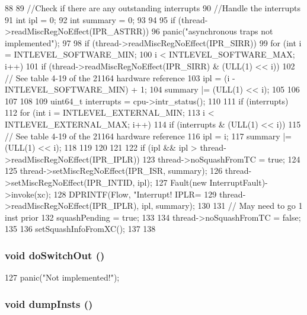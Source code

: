 \begin{DoxyCode}
88 {
89     //Check if there are any outstanding interrupts
90     //Handle the interrupts
91     int ipl = 0;
92     int summary = 0;
93 
94 
95     if (thread->readMiscRegNoEffect(IPR_ASTRR))
96         panic("asynchronous traps not implemented\n");
97 
98     if (thread->readMiscRegNoEffect(IPR_SIRR)) {
99         for (int i = INTLEVEL_SOFTWARE_MIN;
100              i < INTLEVEL_SOFTWARE_MAX; i++) {
101             if (thread->readMiscRegNoEffect(IPR_SIRR) & (ULL(1) << i)) {
102                 // See table 4-19 of the 21164 hardware reference
103                 ipl = (i - INTLEVEL_SOFTWARE_MIN) + 1;
104                 summary |= (ULL(1) << i);
105             }
106         }
107     }
108 
109     uint64_t interrupts = cpu->intr_status();
110 
111     if (interrupts) {
112         for (int i = INTLEVEL_EXTERNAL_MIN;
113              i < INTLEVEL_EXTERNAL_MAX; i++) {
114             if (interrupts & (ULL(1) << i)) {
115                 // See table 4-19 of the 21164 hardware reference
116                 ipl = i;
117                 summary |= (ULL(1) << i);
118             }
119         }
120     }
121 
122     if (ipl && ipl > thread->readMiscRegNoEffect(IPR_IPLR)) {
123         thread->noSquashFromTC = true;
124 
125         thread->setMiscRegNoEffect(IPR_ISR, summary);
126         thread->setMiscRegNoEffect(IPR_INTID, ipl);
127         Fault(new InterruptFault)->invoke(xc);
128         DPRINTF(Flow, "Interrupt! IPLR=%
129                 thread->readMiscRegNoEffect(IPR_IPLR), ipl, summary);
130 
131         // May need to go 1 inst prior
132         squashPending = true;
133 
134         thread->noSquashFromTC = false;
135 
136         setSquashInfoFromXC();
137     }
138 }
\end{DoxyCode}
\hypertarget{classInorderBackEnd_a039b639c41c289e1cfe6d71c41d9308c}{
\subsubsection[{doSwitchOut}]{\setlength{\rightskip}{0pt plus 5cm}void doSwitchOut ()}}
\label{classInorderBackEnd_a039b639c41c289e1cfe6d71c41d9308c}



\begin{DoxyCode}
127 { panic("Not implemented!"); }
\end{DoxyCode}
\hypertarget{classInorderBackEnd_a80587b4fe043bbe1995536cb3b361588}{
\subsubsection[{dumpInsts}]{\setlength{\rightskip}{0pt plus 5cm}void dumpInsts ()}}
\label{classInorderBackEnd_a80587b4fe043bbe1995536cb3b361588}



